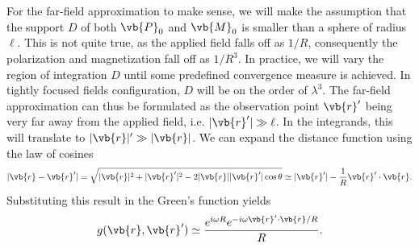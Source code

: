 \documentclass[11pt,SymmetricalJury]{inrsthesis/inrsthesis}
\begin{document}
For the far-field approximation to make sense, we will make the assumption
that the support $D$ of both $\vb{P}_0$ and $\vb{M}_0$ is smaller than a sphere of
radius $\ell$. This is not quite true, as the applied field falls off as
$1/R$, consequently the polarization and magnetization fall off as $1/R^3$.
In practice, we will vary the region of integration $D$ until some predefined
convergence measure is achieved. In tightly focused fields configuration, $D$ will be
on the order of $\lambda^3$. The far-field approximation can thus be formulated
as the observation point $\vb{r}'$ being very far away from the applied field,
i.e. $|\vb{r}'|\gg\ell$. In the integrands, this will translate to $|\vb{r}|'\gg|\vb{r}|$.
We can expand the distance function using the law of cosines
  \begin{equation}
    |\vb{r}-\vb{r}'| = \sqrt{|\vb{r}|^2+|\vb{r}'|^2-2|\vb{r}||\vb{r}'|\cos\theta}\simeq |\vb{r}'|-\frac{1}{R}\vb{r}'\cdot\vb{r}.
  \end{equation}
Substituting this result in the Green's function yields
  \begin{equation}
    g(\vb{r},\vb{r}')\simeq \frac{e^{i\omega R}e^{-i\omega \vb{r}'\cdot\vb{r}/R}}{R}.
  \end{equation}
\end{document}
